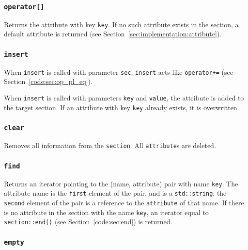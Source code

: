 \subsubsection{{\tt operator[]}}


Returns the attribute with key {\tt key}.  If no such attribute exists
in the section, a default attribute is returned (see
Section~\ref{sec:implementation:attribute}).


\subsubsection[insert]{{\tt insert}}


When {\tt insert} is called with parameter {\tt sec}, {\tt insert}
acts like {\tt operator+=} (see Section~\ref{code:sec:op_pl_eq}).

When {\tt insert} is called with parameters {\tt key} and {\tt value},
the attribute is added to the target section.  If an attribute with
key {\tt key} already exists, it is overwritten.


\subsubsection[clear]{{\tt clear}}


Removes all information from the {\tt section}.  All {\tt attribute}s
are deleted.


\subsubsection[find]{{\tt find}}
\label{code:sec:find}


Returns an iterator pointing to the (name, attribute) pair with name
{\tt key}.
%
The attribute name is the {\tt first} element of the pair, and is a
{\tt std::string}; the {\tt second} element of the pair is a reference
to the {\tt attribute} of that name.
%
If there is no attribute in the section with the name {\tt key}, an
iterator equal to {\tt section::end()} (see
Section~\ref{code:sec:end}) is returned.


\subsubsection[empty]{{\tt empty}}

